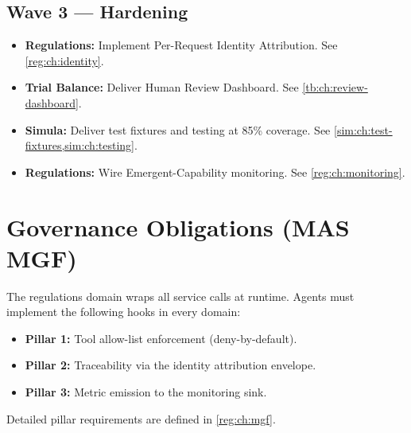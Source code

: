 \subsection*{Wave 3 --- Hardening}
\begin{itemize}
    \item \textbf{Regulations:} Implement Per-Request Identity Attribution. See \cref{reg:ch:identity}.
    \item \textbf{Trial Balance:} Deliver Human Review Dashboard. See \cref{tb:ch:review-dashboard}.
    \item \textbf{Simula:} Deliver test fixtures and testing at 85\% coverage. See \cref{sim:ch:test-fixtures,sim:ch:testing}.
    \item \textbf{Regulations:} Wire Emergent-Capability monitoring. See \cref{reg:ch:monitoring}.
\end{itemize}

\section{Governance Obligations (MAS MGF)}
The regulations domain wraps all service calls at runtime. Agents must implement the following hooks in every domain:
\begin{itemize}
    \item \textbf{Pillar 1:} Tool allow-list enforcement (deny-by-default).
    \item \textbf{Pillar 2:} Traceability via the identity attribution envelope.
    \item \textbf{Pillar 3:} Metric emission to the monitoring sink.
\end{itemize}
Detailed pillar requirements are defined in \cref{reg:ch:mgf}.
